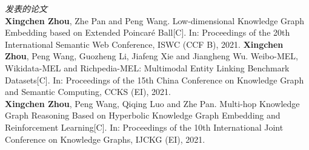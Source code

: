 \documentclass[algorithmlist, AutoFakeBold, AutoFakeSlant, figurelist, tablelist, nomlist, masters]{seuthesix}
\begin{document}
\begin{flushleft}
  \textit{\large 发表的论文}\\ 
  \relax[1] \textbf{Xingchen Zhou}, Zhe Pan and Peng Wang. Low-dimensional Knowledge Graph Embedding based on Extended Poincaré Ball[C]. In: Proceedings of the 20th International Semantic Web Conference, ISWC (CCF B), 2021.
  \relax[2] \textbf{Xingchen Zhou}, Peng Wang, Guozheng Li, Jiafeng Xie and Jiangheng Wu. Weibo-MEL, Wikidata-MEL and Richpedia-MEL: Multimodal Entity Linking Benchmark Datasets[C]. In: Proceedings of the 15th China Conference on Knowledge Graph and Semantic Computing, CCKS (EI), 2021.\\
  \relax[3] \textbf{Xingchen Zhou}, Peng Wang, Qiqing Luo and Zhe Pan. Multi-hop Knowledge Graph Reasoning Based on Hyperbolic Knowledge Graph Embedding and Reinforcement Learning[C]. In: Proceedings of the 10th International Joint Conference on Knowledge Graphs, IJCKG (EI), 2021.\\

  
  
  \end{flushleft}
\end{document}
